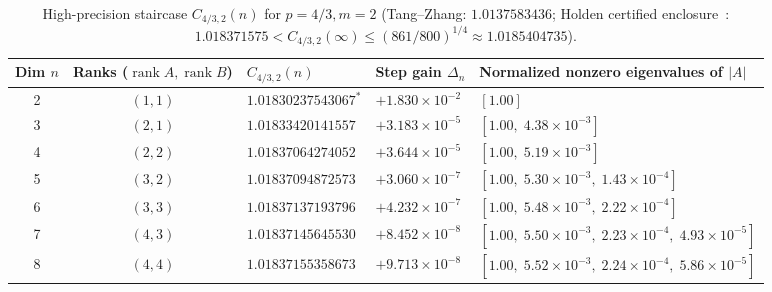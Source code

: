 \documentclass[10pt,letterpaper]{article}
\newcommand{\rank}{\operatorname{rank}}
\begin{document}
\begin{table}[H]
\centering
\caption{\small High-precision staircase $C_{4/3,2}(n)$ for $p = 4/3, m = 2$ (Tang--Zhang: $1.0137583436$; Holden certified enclosure~\cite{Holden2026}: $1.018371575 < C_{4/3,2}(\infty) \le (861/800)^{1/4} \approx 1.0185404735$).}
\vspace{3pt}
\footnotesize
\begin{tabular}{@{}c c l l l@{}}
\toprule
\textbf{Dim $n$} & \textbf{Ranks ($\rank A, \rank B$)} & \textbf{$C_{4/3,2}(n)$} & \textbf{Step gain $\Delta_n$} & \textbf{Normalized nonzero eigenvalues of $|A|$} \\
\midrule
2 & $(1,1)$ & $1.01830237543067^*$ & $+1.830\times 10^{-2}$ & $[1.00]$ \\
3 & $(2,1)$ & $1.01833420141557$   & $+3.183\times 10^{-5}$ & $[1.00,\; 4.38\times 10^{-3}]$ \\
4 & $(2,2)$ & $1.01837064274052$   & $+3.644\times 10^{-5}$ & $[1.00,\; 5.19\times 10^{-3}]$ \\
5 & $(3,2)$ & $1.01837094872573$   & $+3.060\times 10^{-7}$ & $[1.00,\; 5.30\times 10^{-3},\; 1.43\times 10^{-4}]$ \\
6 & $(3,3)$ & $1.01837137193796$   & $+4.232\times 10^{-7}$ & $[1.00,\; 5.48\times 10^{-3},\; 2.22\times 10^{-4}]$ \\
7 & $(4,3)$ & $1.01837145645530$   & $+8.452\times 10^{-8}$ & $[1.00,\; 5.50\times 10^{-3},\; 2.23\times 10^{-4},\; 4.93\times 10^{-5}]$ \\
8 & $(4,4)$ & $1.01837155358673$   & $+9.713\times 10^{-8}$ & $[1.00,\; 5.52\times 10^{-3},\; 2.24\times 10^{-4},\; 5.86\times 10^{-5}]$ \\
\bottomrule
\end{tabular}
\label{tab:p43}
\end{table}
\end{document}

